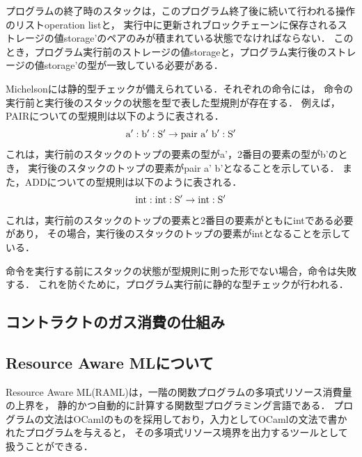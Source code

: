 \documentclass{kuisthesis}
\begin{document}
プログラムの終了時のスタックは，このプログラム終了後に続いて行われる操作のリストoperation listと，
実行中に更新されブロックチェーンに保存されるストレージの値storage'のペアのみが積まれている状態でなければならない．
このとき，プログラム実行前のストレージの値storageと，プログラム実行後のストレージの値storage'の型が一致している必要がある．

Michelsonには静的型チェックが備えられている．それぞれの命令には，
命令の実行前と実行後のスタックの状態を型で表した型規則が存在する．
例えば，PAIRについての型規則は以下のように表される．
\begin{displaymath}
  {\rm a' : b' : S'} \rightarrow {\rm pair\ a'\ b' : S'}
\end{displaymath}
これは，実行前のスタックのトップの要素の型がa'，2番目の要素の型がb'のとき，
実行後のスタックのトップの要素がpair a' b'となることを示している．
また，ADDについての型規則は以下のように表される．
\begin{displaymath}
  {\rm int : int : S'} \rightarrow {\rm int : S'}
\end{displaymath}
これは，実行前のスタックのトップの要素と2番目の要素がともにintである必要があり，
その場合，実行後のスタックのトップの要素がintとなることを示している．

命令を実行する前にスタックの状態が型規則に則った形でない場合，命令は失敗する．
これを防ぐために，プログラム実行前に静的な型チェックが行われる．

\subsection{コントラクトのガス消費の仕組み}\label{subsec-pre-gas}

\subsection{Resource Aware MLについて}\label{subsec-pre-raml}
Resource Aware ML(RAML)は，一階の関数プログラムの多項式リソース消費量の上界を，
静的かつ自動的に計算する関数型プログラミング言語である．
プログラムの文法はOCamlのものを採用しており，入力としてOCamlの文法で書かれたプログラムを与えると，
その多項式リソース境界を出力するツールとして扱うことができる．
\end{document}
